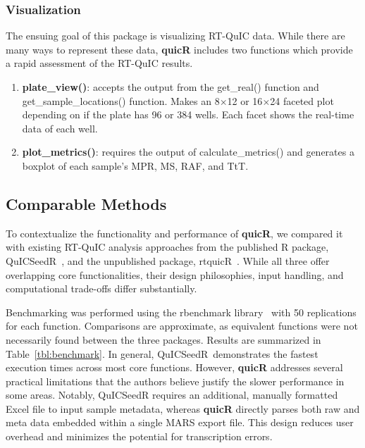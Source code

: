 \documentclass[preprint,12pt,a4paper]{elsarticle}
\begin{document}
            \subsubsection{Visualization}
                The ensuing goal of this package is visualizing RT-QuIC data. While there are many ways to represent these data, \textbf{quicR} includes two functions which provide a rapid assessment of the RT-QuIC results.
                \begin{enumerate}
                    \item \textbf{plate\_view()}: accepts the output from the get\_real() function and get\_sample\_locations() function. Makes an 8$\times$12 or 16$\times$24 faceted plot depending on if the plate has 96 or 384 wells. Each facet shows the real-time data of each well.
                    \item \textbf{plot\_metrics()}: requires the output of calculate\_metrics() and generates a boxplot of each sample's MPR, MS, RAF, and TtT.
                \end{enumerate}
        
        \subsection{Comparable Methods}
            To contextualize the functionality and performance of \textbf{quicR}, we compared it with existing RT-QuIC analysis approaches from the published R package, QuICSeedR\ \cite{Li2025}, and the unpublished package, rtquicR\ \cite{Slota2023}. While all three offer overlapping core functionalities, their design philosophies, input handling, and computational trade-offs differ substantially.

            Benchmarking was performed using the rbenchmark library~\cite{rbenchmark} with 50 replications for each function. Comparisons are approximate, as equivalent functions were not necessarily found between the three packages. Results are summarized in Table~\ref{tbl:benchmark}. In general, QuICSeedR\ demonstrates the fastest execution times across most core functions. However, \textbf{quicR} addresses several practical limitations that the authors believe justify the slower performance in some areas. Notably, QuICSeedR requires an additional, manually formatted Excel file to input sample metadata, whereas \textbf{quicR} directly parses both raw and meta data embedded within a single MARS export file. This design reduces user overhead and minimizes the potential for transcription errors.
\end{document}
